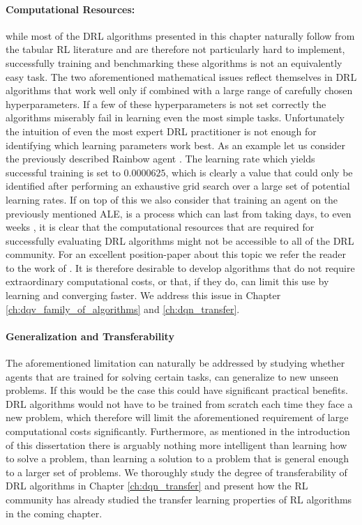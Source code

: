 \paragraph{Computational Resources:} while most of the DRL algorithms presented in this chapter naturally follow from the tabular RL literature and are therefore not particularly hard to implement, successfully training and benchmarking these algorithms is not an equivalently easy task. 
The two aforementioned mathematical issues reflect themselves in DRL algorithms that work well only if combined with a large range of carefully chosen hyperparameters. If a few of these hyperparameters is not set correctly the algorithms miserably fail in learning even the most simple tasks. Unfortunately the intuition of even the most expert DRL practitioner is not enough for identifying which learning parameters work best. As an example let us consider the previously described Rainbow agent \cite{hessel2018rainbow}. The learning rate which yields successful training is set to $0.0000625$, which is clearly a value that could only be identified after performing an exhaustive grid search over a large set of potential learning rates. If on top of this we also consider that training an agent on the previously mentioned ALE, is a process which can last from taking days, to even weeks \cite{kaiser2019model}, it is clear that the computational resources that are required for successfully evaluating DRL algorithms might not be accessible to all of the DRL community. For an excellent position-paper about this topic we refer the reader to the work of \citet{obando2020revisiting}. It is therefore desirable to develop algorithms that do not require extraordinary computational costs, or that, if they do, can limit this use by learning and converging faster. We address this issue in Chapter \ref{ch:dqv_family_of_algorithms} and \ref{ch:dqn_transfer}.


\paragraph{Generalization and Transferability}
The aforementioned limitation can naturally be addressed by studying whether agents that are trained for solving certain tasks, can generalize to new unseen problems. If this would be the case this could have significant practical benefits. DRL algorithms would not have to be trained from scratch each time they face a new problem, which therefore will limit the aforementioned requirement of large computational costs significantly. Furthermore, as mentioned in the introduction of this dissertation there is arguably nothing more intelligent than learning how to solve a problem, than learning a solution to a problem that is general enough to a larger set of problems. We thoroughly study the degree of transferability of DRL algorithms in Chapter \ref{ch:dqn_transfer} and present how the RL community has already studied the transfer learning properties of RL algorithms in the coming chapter.




